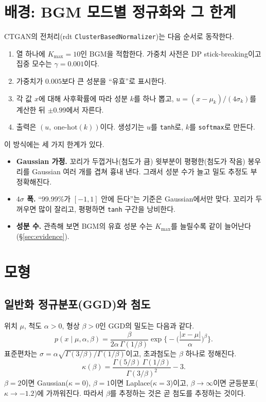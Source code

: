 \documentclass[11pt]{article}
\begin{document}
\section{배경: BGM 모드별 정규화와 그 한계}

CTGAN의 전처리(rdt \texttt{ClusterBasedNormalizer})는 다음 순서로 동작한다.
\begin{enumerate}
  \item 열 하나에 $K_{\max}=10$인 BGM을 적합한다. 가중치 사전은 DP stick-breaking이고 집중 모수는 $\gamma=0.001$이다.
  \item 가중치가 $0.005$보다 큰 성분을 ``유효''로 표시한다.
  \item 각 값 $x$에 대해 사후확률에 따라 성분 $k$를 하나 뽑고, $u=(x-\mu_k)/(4\sigma_k)$를 계산한 뒤 $\pm 0.99$에서 자른다.
  \item 출력은 $(u,\ \text{one-hot}(k))$이다. 생성기는 $u$를 \texttt{tanh}로, $k$를 \texttt{softmax}로 만든다.
\end{enumerate}

이 방식에는 세 가지 한계가 있다.
\begin{itemize}
  \item \textbf{Gaussian 가정.} 꼬리가 두껍거나(첨도가 큼) 윗부분이 평평한(첨도가 작음) 봉우리를 Gaussian 여러 개를 겹쳐 흉내 낸다. 그래서 성분 수가 늘고 밀도 추정도 부정확해진다.
  \item \textbf{$4\sigma$ 폭.} ``99.99\%가 $[-1,1]$ 안에 든다''는 기준은 Gaussian에서만 맞다. 꼬리가 두꺼우면 많이 잘리고, 평평하면 \texttt{tanh} 구간을 낭비한다.
  \item \textbf{성분 수.} 관측해 보면 BGM의 유효 성분 수는 $K_{\max}$를 늘릴수록 같이 늘어난다(\S\ref{sec:evidence}).
\end{itemize}

\section{모형}

\subsection{일반화 정규분포(GGD)와 첨도}
위치 $\mu$, 척도 $\alpha>0$, 형상 $\beta>0$인 GGD의 밀도는 다음과 같다.
\begin{equation}
  p(x\mid\mu,\alpha,\beta)=\frac{\beta}{2\alpha\,\Gamma(1/\beta)}\exp\!\Big\{-\Big(\frac{|x-\mu|}{\alpha}\Big)^{\beta}\Big\}.
\end{equation}
표준편차는 $\sigma=\alpha\sqrt{\Gamma(3/\beta)/\Gamma(1/\beta)}$이고, 초과첨도는 $\beta$ 하나로 정해진다.
\begin{equation}\label{eq:kurt}
  \kappa(\beta)=\frac{\Gamma(5/\beta)\,\Gamma(1/\beta)}{\Gamma(3/\beta)^2}-3 .
\end{equation}
$\beta=2$이면 Gaussian($\kappa=0$), $\beta=1$이면 Laplace($\kappa=3$)이고, $\beta\to\infty$이면 균등분포($\kappa\to-1.2$)에 가까워진다.
따라서 $\beta$를 추정하는 것은 곧 첨도를 추정하는 것이다.
\end{document}

